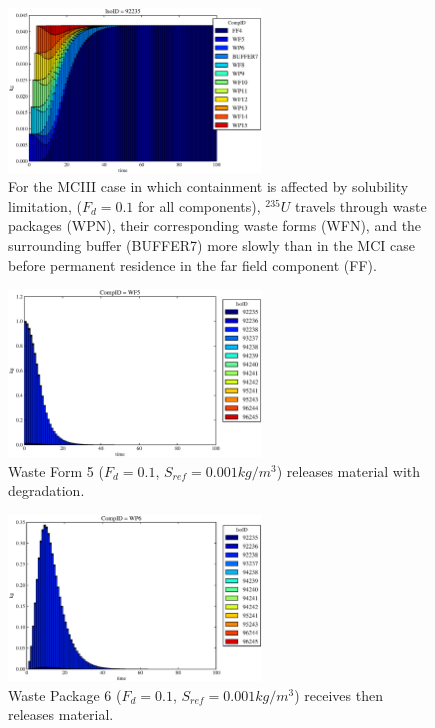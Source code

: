 
\begin{figure}[ht]
\centering
\includegraphics[width=0.6\textwidth]{./results/images/mcIII.eps}
\caption[$^{235}U$ residence. Mixed Cell Coupled Sorption and Solubility Limitation.]{
For the MCIII case in which containment is affected by solubility limitation,
        ($F_{d}=0.1$ for all components), $^{235}U$ travels through waste 
        packages (WPN), their corresponding waste forms (WFN), and the surrounding 
        buffer (BUFFER7) more slowly than in the MCI case
        before permanent residence in the far field component (FF).
}
\label{fig:mcIIIall}
\end{figure}

\begin{figure}[ht]
\centering
  \includegraphics[width=0.6\textwidth]{./results/images/mcIII1.eps}
  \caption[Case MCIII Waste Form Contaminants.]{
    Waste Form 5 ($F_d = 0.1$, $S_{ref} = 0.001kg/m^3$) releases material with degradation.
    }
  \label{fig:mcIIIwf5}
\end{figure}


\begin{figure}[ht]
\centering
  \includegraphics[width=0.6\textwidth]{./results/images/mcIII2.eps}
  \caption[Case MCIII Waste Package Contaminants.]{
    Waste Package 6 ($F_d = 0.1$, $S_{ref}=0.001kg/m^3$) receives then releases material.
    }
  \label{fig:mcIIIwp6}
\end{figure}

